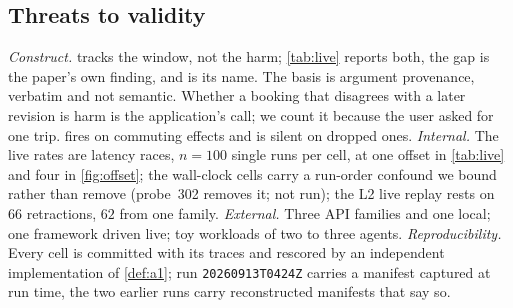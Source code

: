 \subsection{Threats to validity}
\label{sec:threats}
\emph{Construct.}  tracks the window, not the harm; \cref{tab:live}
reports both, the gap is the paper's own finding, and \Rp{} is its name. The
basis is argument provenance, verbatim and not semantic. Whether a booking
that disagrees with a later revision is harm is the application's call; we
count it because the user asked for one trip.  fires on commuting
effects and is silent on dropped ones. \emph{Internal.} The live rates are
latency races, $n=100$ single runs per cell, at one offset in \cref{tab:live}
and four in \cref{fig:offset}; the wall-clock cells carry a run-order
confound we bound rather than remove (probe~302 removes it; not run); the L2
live replay rests on $66$ retractions, $62$ from one family. \emph{External.} Three API families and one local; one
framework driven live; toy workloads of two to three agents. \emph{Reproducibility.} Every cell is
committed with its traces and rescored by an independent implementation of
\cref{def:a1}; run \texttt{20260913T0424Z} carries a manifest captured at run
time, the two earlier runs carry reconstructed manifests that say so.
